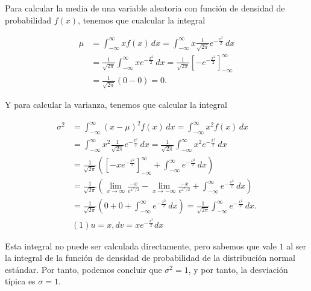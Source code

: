 \documentclass[
  spanish,
  a4paper,
]{scrreport}
\theoremstyle{definition}
\theoremstyle{remark}
\begin{document}
\begin{tcolorbox}[enhanced jigsaw, arc=.35mm, bottomrule=.15mm, bottomtitle=1mm, breakable, colback=white, colbacktitle=quarto-callout-tip-color!10!white, colframe=quarto-callout-tip-color-frame, coltitle=black, left=2mm, leftrule=.75mm, opacityback=0, opacitybacktitle=0.6, rightrule=.15mm, title=\textcolor{quarto-callout-tip-color}{\faLightbulb}\hspace{0.5em}{Solución}, titlerule=0mm, toprule=.15mm, toptitle=1mm]

Para calcular la media de una variable aleatoria con función de densidad
de probabilidad \(f(x)\), tenemos que cualcular la integral

\begin{align*}
\mu 
&= \int_{-\infty}^\infty x f(x)\,dx
= \int_{-\infty}^\infty x \frac{1}{\sqrt{2\pi}} e^{-\frac{x^2}{2}}\,dx\\
&= \frac{1}{\sqrt{2\pi}} \int_{-\infty}^\infty x e^{-\frac{x^2}{2}}\,dx
= \frac{1}{\sqrt{2\pi}} \left[ -e^{-\frac{x^2}{2}} \right]_{-\infty}^\infty \tag{Cambio $u=-x^2/2$}\\
&= \frac{1}{\sqrt{2\pi}} \left( 0 - 0 \right)
= 0.
\end{align*}

Y para calcular la varianza, tenemos que calcular la integral

\begin{align*}
\sigma^2
&= \int_{-\infty}^\infty (x - \mu)^2 f(x)\,dx
= \int_{-\infty}^\infty x^2 f(x)\,dx \tag{Como $\mu = 0$}\\
&= \int_{-\infty}^\infty x^2 \frac{1}{\sqrt{2\pi}} e^{-\frac{x^2}{2}}\,dx
= \frac{1}{\sqrt{2\pi}} \int_{-\infty}^\infty x^2 e^{-\frac{x^2}{2}}\,dx \\
&= \frac{1}{\sqrt{2\pi}} \left(\left[ -x e^{-\frac{x^2}{2}} \right]_{-\infty}^\infty + \int_{-\infty}^\infty e^{-\frac{x^2}{2}}\,dx\right) \tag{Integración por partes (1)}\\
&= \frac{1}{\sqrt{2\pi}} \left( \lim_{x\to\infty} \frac{-x}{e^{x^2/2}} - \lim_{x\to-\infty} \frac{-x}{e^{x^2/2}} + \int_{-\infty}^\infty e^{-\frac{x^2}{2}}\,dx \right) \\
&= \frac{1}{\sqrt{2\pi}} \left( 0 + 0 + \int_{-\infty}^\infty e^{-\frac{x^2}{2}}\,dx \right)
= \frac{1}{\sqrt{2\pi}} \int_{-\infty}^\infty e^{-\frac{x^2}{2}}\,dx.\\
&(1) u = x, dv = xe^{-\frac{x^2}{2}}dx
\end{align*}

Esta integral no puede ser calculada directamente, pero sabemos que vale
\(1\) al ser la integral de la función de densidad de probabilidad de la
distribución normal estándar. Por tanto, podemos concluir que
\(\sigma^2 = 1\), y por tanto, la desviación típica es \(\sigma = 1\).

\end{tcolorbox}
\end{document}
